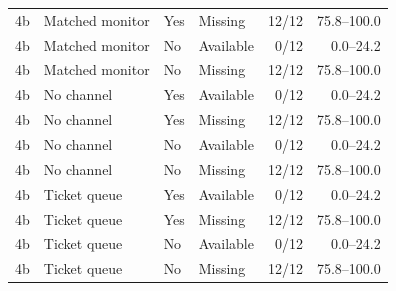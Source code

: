 \begin{longtable}{@{}ll ll rr@{}}
4b & Matched monitor & Yes & Missing & 12/12 & 75.8--100.0 \\
4b & Matched monitor & No & Available & 0/12 & 0.0--24.2 \\
4b & Matched monitor & No & Missing & 12/12 & 75.8--100.0 \\
4b & No channel & Yes & Available & 0/12 & 0.0--24.2 \\
4b & No channel & Yes & Missing & 12/12 & 75.8--100.0 \\
4b & No channel & No & Available & 0/12 & 0.0--24.2 \\
4b & No channel & No & Missing & 12/12 & 75.8--100.0 \\
4b & Ticket queue & Yes & Available & 0/12 & 0.0--24.2 \\
4b & Ticket queue & Yes & Missing & 12/12 & 75.8--100.0 \\
4b & Ticket queue & No & Available & 0/12 & 0.0--24.2 \\
4b & Ticket queue & No & Missing & 12/12 & 75.8--100.0 \\
\bottomrule
\end{longtable}
